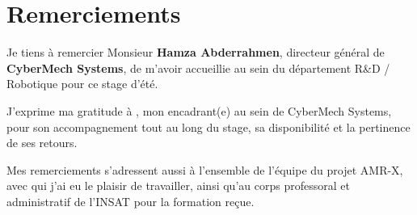 \chapter*{Remerciements}

Je tiens à remercier Monsieur \textbf{Hamza Abderrahmen}, directeur général de
\textbf{CyberMech Systems}, de m'avoir accueillie au sein du département R\&D / Robotique
pour ce stage d'été.

J'exprime ma gratitude à , mon encadrant(e) au sein de
CyberMech Systems, pour son accompagnement tout au long du stage, sa disponibilité et la
pertinence de ses retours.

Mes remerciements s'adressent aussi à l'ensemble de l'équipe du projet AMR-X, avec qui
j'ai eu le plaisir de travailler, ainsi qu'au corps professoral et administratif de l'INSAT
pour la formation reçue.

\cleardoublepage
\renewcommand{\contentsname}{Table des matières}
\tableofcontents
\cleardoublepage
\renewcommand{\listfigurename}{Table des figures}
\listoffigures
\cleardoublepage
\renewcommand{\listtablename}{Liste des tableaux}
\listoftables

\cleardoublepage

